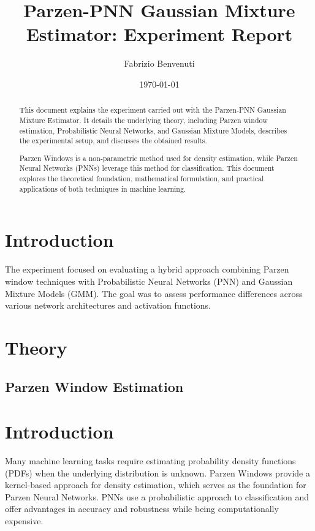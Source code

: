 \documentclass{article}
\begin{document}
\title{Parzen-PNN Gaussian Mixture Estimator: Experiment Report}
\author{Fabrizio Benvenuti}
\date{\today}
\maketitle

\begin{abstract}
This document explains the experiment carried out with the Parzen-PNN Gaussian Mixture Estimator. It details the underlying theory, including Parzen window estimation, Probabilistic Neural Networks, and Gaussian Mixture Models, describes the experimental setup, and discusses the obtained results.
\end{abstract}

\section{Introduction}
The experiment focused on evaluating a hybrid approach combining Parzen window techniques with Probabilistic Neural Networks (PNN) and Gaussian Mixture Models (GMM). The goal was to assess performance differences across various network architectures and activation functions.

\section{Theory}
\subsection{Parzen Window Estimation}
\begin{abstract}
Parzen Windows is a non-parametric method used for density estimation, while Parzen Neural Networks (PNNs) leverage this method for classification. This document explores the theoretical foundation, mathematical formulation, and practical applications of both techniques in machine learning.
\end{abstract}

\section{Introduction}
Many machine learning tasks require estimating probability density functions (PDFs) when the underlying distribution is unknown. Parzen Windows provide a kernel-based approach for density estimation, which serves as the foundation for Parzen Neural Networks. PNNs use a probabilistic approach to classification and offer advantages in accuracy and robustness while being computationally expensive. 
\end{document}
